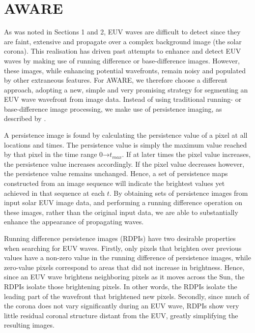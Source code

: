 \section{AWARE}\label{sec:aware}

As was noted in Sections 1 and 2, EUV waves are difficult to detect since they are faint, extensive and propagate over a complex background image (the solar corona). This realisation has driven past attempts to enhance and detect EUV waves by making use of running difference or base-difference images. However, these images, while enhancing potential wavefronts, remain noisy and populated by other extraneous features. For AWARE, we therefore choose a different approach, adopting a new, simple and very promising strategy for segmenting an EUV wave wavefront from image data. Instead of using traditional running- or base-difference image processing, we make use of persistence imaging, as described by \citet{2014AAS...22421838T}. 

A persistence image is found by calculating the persistence value of a pixel at all locations and times.  The persistence value is simply the maximum value reached by that pixel in the time range 0→$t_{max}$.  If at later times the pixel value increases, the persistence value increases accordingly. If the pixel value decreases however, the persistence value remains unchanged. Hence, a set of persistence maps constructed from an image sequence will indicate the brightest values yet achieved in that sequence at each $t$. By obtaining sets of persistence images from input solar EUV image data, and performing a running difference operation on these images, rather than the original input data, we are able to substantially enhance the appearance of propagating waves.

Running difference persistence images (RDPIs) have two desirable properties when searching for EUV waves.  Firstly, only pixels that brighten over previous values have a non-zero value in the running difference of persistence images, while zero-value pixels correspond to areas that did not increase in brightness. Hence, since an EUV wave brightens neighboring pixels as it moves across the Sun, the RDPIs isolate those brightening pixels.  In other words, the RDPIs isolate the leading part of the wavefront that brightened new pixels.  Secondly, since much of the corona does not vary significantly during an EUV wave, RDPIs show very little residual coronal structure distant from the EUV, greatly simplifying the resulting images.  

